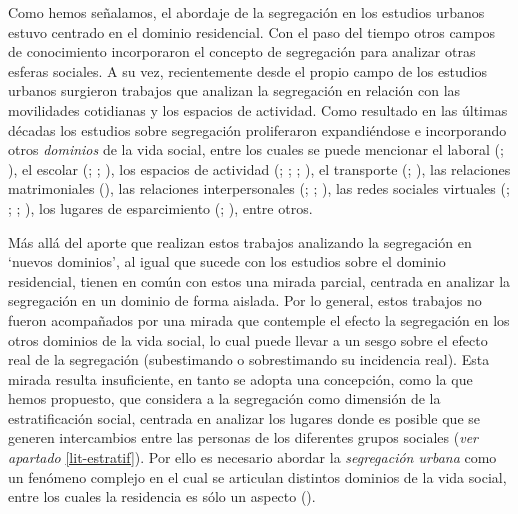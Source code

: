 \documentclass[
  spanish,
  a4paper,%
  chapterprefix=true,%
  DIV=calc,%
  twoside]{scrbook}%
\begin{document}
Como hemos señalamos, el abordaje de la segregación en los estudios
urbanos estuvo centrado en el dominio residencial.
Con el paso del tiempo
otros campos de conocimiento incorporaron el concepto de segregación
para analizar otras esferas sociales. A su vez, recientemente desde el
propio campo de los estudios urbanos surgieron trabajos que analizan la
segregación en relación con las movilidades cotidianas y los espacios de
actividad. Como resultado en las últimas décadas los estudios sobre
segregación proliferaron expandiéndose e incorporando otros \emph{dominios}
de la vida social, entre los cuales se puede mencionar el laboral
(; ), el escolar (; ; ), los espacios de actividad (; ; ; ), el transporte (; ), las relaciones matrimoniales (), las
relaciones interpersonales (; ; ),
las redes sociales virtuales (; ; ; ), los lugares de esparcimiento (; ),
entre otros.

Más allá del aporte que realizan estos trabajos analizando la
segregación en `nuevos dominios', al igual que sucede con los estudios
sobre el dominio residencial, tienen en común con estos una mirada
parcial, centrada en analizar la segregación en un dominio de forma
aislada. Por lo general, estos trabajos no fueron acompañados por una
mirada que contemple el efecto la segregación en los otros dominios de
la vida social, lo cual puede llevar a un sesgo sobre el efecto real de
la segregación (subestimando o sobrestimando su incidencia real). Esta
mirada resulta insuficiente, en tanto se adopta una concepción, como la
que hemos propuesto, que considera a la segregación como dimensión de la
estratificación social, centrada en analizar los lugares donde es
posible que se generen intercambios entre las personas de los diferentes
grupos sociales (\emph{ver apartado} \ref{lit-estratif}). Por ello es
necesario abordar la \emph{segregación urbana} como un fenómeno complejo en
el cual se articulan distintos dominios de la vida social, entre los
cuales la residencia es sólo un aspecto ().
\end{document}
